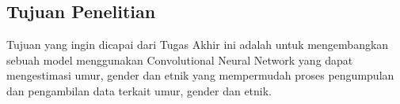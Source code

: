 \subsection{Tujuan Penelitian}

Tujuan yang ingin dicapai dari Tugas Akhir ini adalah untuk mengembangkan sebuah model menggunakan 
Convolutional Neural Network yang dapat mengestimasi umur, gender dan etnik yang mempermudah proses 
pengumpulan dan pengambilan data terkait umur, gender dan etnik.